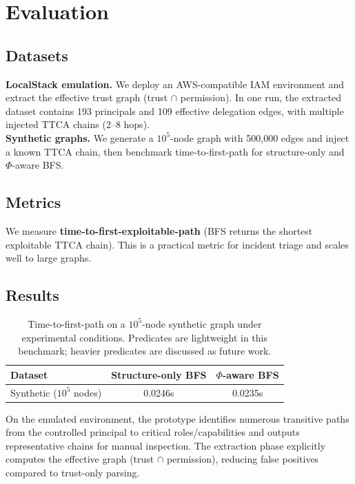 \documentclass[a4paper,11pt]{article}
\begin{document}
\section{Evaluation}

\subsection{Datasets}
\textbf{LocalStack emulation.} We deploy an AWS-compatible IAM environment and extract the effective trust graph (trust $\cap$ permission). In one run, the extracted dataset contains 193 principals and 109 effective delegation edges, with multiple injected TTCA chains (2--8 hops).\\
\textbf{Synthetic graphs.} We generate a $10^5$-node graph with 500,000 edges and inject a known TTCA chain, then benchmark time-to-first-path for structure-only and \(\Phi\)-aware BFS.

\subsection{Metrics}
We measure \textbf{time-to-first-exploitable-path} (BFS returns the shortest exploitable TTCA chain). This is a practical metric for incident triage and scales well to large graphs.

\subsection{Results}
\begin{table}[h]
\centering
\begin{tabular}{@{}lcc@{}}
\toprule
\textbf{Dataset} & \textbf{Structure-only BFS} & \textbf{$\Phi$-aware BFS} \\
\midrule
Synthetic ($10^5$ nodes) & 0.0246s & 0.0235s \\
\bottomrule
\end{tabular}
\caption{Time-to-first-path on a $10^5$-node synthetic graph under experimental conditions. Predicates are lightweight in this benchmark; heavier predicates are discussed as future work.}
\end{table}

On the emulated environment, the prototype identifies numerous transitive paths from the controlled principal to critical roles/capabilities and outputs representative chains for manual inspection. The extraction phase explicitly computes the effective graph (trust $\cap$ permission), reducing false positives compared to trust-only parsing.
\end{document}
